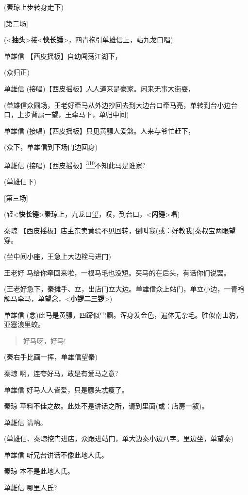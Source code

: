 (秦琼上步转身走下)

{[}第二场{]}

(\textless{}\textbf{抽头}\textgreater{}接\textless{}\textbf{快长锤}\textgreater{}，四青袍引单雄信上，站九龙口唱)

单雄信 【西皮摇板】自幼闯荡江湖下，

(众归正)

单雄信 (接唱)【西皮摇板】人人道来是豪家。闲来无事大街耍，

(单雄信众圆场，王老好牵马从外边抄回去到大边台口牵马亮，单转到台小边台口，上步背扇一望，王牵马下，单归中间)

单雄信 (接唱)【西皮摇板】只见黄骠人爱煞。人来与爷忙赶下，

(众下，单雄信到下场门边回身)

单雄信
(接唱)【西皮摇板】\protect\hyperlink{fn310}{\textsuperscript{310}}不知此马是谁家?

(单雄信下)

{[}第三场{]}

(轻\textless{}\textbf{快长锤}\textgreater{}秦琼上，九龙口望，叹，到台口，\textless{}\textbf{闪锤}\textgreater{}唱)

秦琼
【西皮摇板】店主东卖黄骠不见回转，倒叫我(或：好教我)秦叔宝两眼望穿。

(坐中间小座，王急上大边栓马进门)

王老好 马给你牵回来啦，一根马毛也没短。买马的在后头，有话你们说罢。

(王老好急下，秦摊手、立，出店门立大边。单雄信众上站门，单立小边，一青袍解马牵马，单望念，\textless{}\textbf{小锣二三锣}\textgreater{})

单雄信
(念)此马是黄骠，四蹄似雪飘。浑身发金色，遍体无杂毛。胜似南山豹，亚塞浪里蛟。

\begin{quote}
好马呀，好马!
\end{quote}

(秦右手比画一挥，单雄信望秦)

秦琼 啊，连夸好马，敢是有爱马之意?

单雄信 好马人人皆爱，只是膘头忒瘦了。

秦琼 草料不佳之故。此处不是讲话之所，请到里面(或：店房一叙)。

单雄信 请呐。

(单雄信、秦琼挖门进店，众跟进站门，单大边秦小边八字。里边坐，单望秦)

单雄信 听兄台讲话不像此地人氏。

秦琼 本不是此地人氏。

单雄信 哪里人氏?

